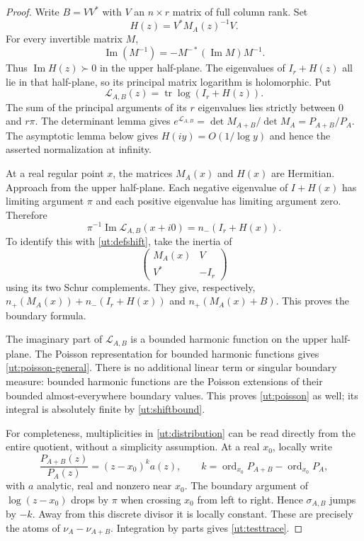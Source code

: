 \begin{proof}
Write $B=VV^*$ with $V$ an $n\times r$ matrix of full column rank. Set
\[
 H(z)=V^*M_A(z)^{-1}V.
\]
For every invertible matrix $M$,
\[
 \operatorname{Im}(M^{-1})
       =-M^{-*}(\operatorname{Im}M)M^{-1}.
\]
Thus $\operatorname{Im}H(z)\succ0$ in the upper half-plane. The eigenvalues
of $I_r+H(z)$ all lie in that half-plane, so its principal matrix logarithm
is holomorphic. Put
\[
 \mathcal L_{A,B}(z)=\operatorname{tr}\log(I_r+H(z)).
\]
The sum of the principal arguments of its $r$ eigenvalues lies strictly
between $0$ and $r\pi$. The determinant lemma gives
$e^{\mathcal L_{A,B}}=\det M_{A+B}/\det M_A=P_{A+B}/P_A$.
The asymptotic lemma below gives $H(iy)=O(1/\log y)$ and hence the asserted
normalization at infinity.

At a real regular point $x$, the matrices $M_A(x)$ and $H(x)$ are Hermitian.
Approach from the upper half-plane. Each negative eigenvalue of $I+H(x)$
has limiting argument $\pi$ and each positive eigenvalue has limiting
argument zero. Therefore
\[
 \pi^{-1}\operatorname{Im}\mathcal L_{A,B}(x+i0)=n_-(I_r+H(x)).
\]
To identify this with \eqref{ut:defshift}, take the inertia of
\[
 \begin{pmatrix}M_A(x)&V\\ V^*&-I_r\end{pmatrix}
\]
using its two Schur complements. They give, respectively,
$n_+(M_A(x))+n_-(I_r+H(x))$ and $n_+(M_A(x)+B)$.
This proves the boundary formula.

The imaginary part of $\mathcal L_{A,B}$ is a bounded harmonic function
on the upper half-plane. The Poisson representation for bounded harmonic
functions gives \eqref{ut:poisson-general}. There is no additional linear
term or singular boundary measure: bounded harmonic functions are the
Poisson extensions of their bounded almost-everywhere boundary values.
This proves \eqref{ut:poisson} as well; its integral is absolutely finite
by \eqref{ut:shiftbound}.

For completeness, multiplicities in \eqref{ut:distribution} can be read
directly from the entire quotient, without a simplicity assumption.
At a real $x_0$, locally write
\[
 \frac{P_{A+B}(z)}{P_A(z)}=(z-x_0)^k a(z),\qquad
 k=\operatorname{ord}_{x_0}P_{A+B}-\operatorname{ord}_{x_0}P_A,
\]
with $a$ analytic, real and nonzero near $x_0$. The boundary argument
of $\log(z-x_0)$ drops by $\pi$ when crossing $x_0$ from left to right.
Hence $\sigma_{A,B}$ jumps by $-k$. Away from this discrete divisor it
is locally constant. These are precisely the atoms of
$\nu_A-\nu_{A+B}$. Integration by parts gives \eqref{ut:testtrace}.
\end{proof}

